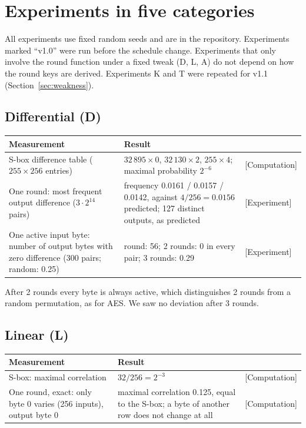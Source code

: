 \documentclass[11pt,a4paper]{article}
\newcommand{\ev}[1]{\textup{\textsf{[#1]}}}
\begin{document}
\section{Experiments in five categories}\label{sec:exp}

All experiments use fixed random seeds and are in the repository. Experiments marked ``v1.0'' were run before
the schedule change. Experiments that only involve the round function under a fixed tweak (D, L, A) do not
depend on how the round keys are derived. Experiments K and T were repeated for v1.1
(Section~\ref{sec:weakness}).

\subsection{Differential (D)}

\begin{center}\small
\begin{tabularx}{\textwidth}{@{}>{\raggedright\arraybackslash}X>{\raggedright\arraybackslash}Xl@{}}
\toprule
Measurement & Result & \\
\midrule
S-box difference table ($255 \times 256$ entries) & $32\,895\times 0$, $32\,130\times 2$, $255\times 4$;
  maximal probability $2^{-6}$ & \ev{Computation}\\
One round: most frequent output difference ($3\cdot 2^{14}$ pairs) & frequency 0.0161 / 0.0157 / 0.0142, against
  $4/256 = 0.0156$ predicted; 127 distinct outputs, as predicted & \ev{Experiment}\\
One active input byte: number of output bytes with zero difference (300 pairs; random: 0.25) & 1 round: 56;
  2 rounds: 0 in every pair; 3 rounds: 0.29 & \ev{Experiment}\\
\bottomrule
\end{tabularx}
\end{center}

After 2 rounds every byte is always active, which distinguishes 2 rounds from a random permutation, as for AES.
We saw no deviation after 3 rounds.

\subsection{Linear (L)}

\begin{center}\small
\begin{tabularx}{\textwidth}{@{}>{\raggedright\arraybackslash}X>{\raggedright\arraybackslash}Xl@{}}
\toprule
Measurement & Result & \\
\midrule
S-box: maximal correlation & $32/256 = 2^{-3}$ & \ev{Computation}\\
One round, exact: only byte 0 varies (256 inputs), output byte 0 & maximal correlation 0.125, equal to the
  S-box; a byte of another row does not change at all & \ev{Computation}\\
\bottomrule
\end{tabularx}
\end{center}
\end{document}
